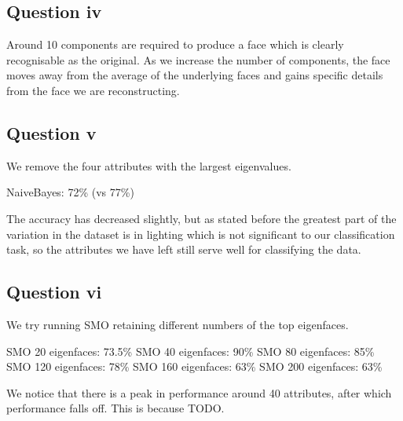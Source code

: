 \documentclass[a4paper]{article}
\begin{document}
\subsection*{Question iv}
Around 10 components are required to produce a face which is clearly recognisable as the original. As we increase the number of components, the face moves away from the average of the underlying faces and gains specific details from the face we are reconstructing.

\subsection*{Question v}
We remove the four attributes with the largest eigenvalues.

NaiveBayes: 72\% (vs 77\%)

The accuracy has decreased slightly, but as stated before the greatest part of the variation in the dataset is in lighting which is not significant to our classification task, so the attributes we have left still serve well for classifying the data.

\subsection*{Question vi}
We try running SMO retaining different numbers of the top eigenfaces.

SMO 20 eigenfaces: 73.5\%
SMO 40 eigenfaces: 90\%
SMO 80 eigenfaces: 85\%
SMO 120 eigenfaces: 78\%
SMO 160 eigenfaces: 63\%
SMO 200 eigenfaces: 63\%

We notice that there is a peak in performance around 40 attributes, after which performance falls off. This is because TODO.
\end{document}
